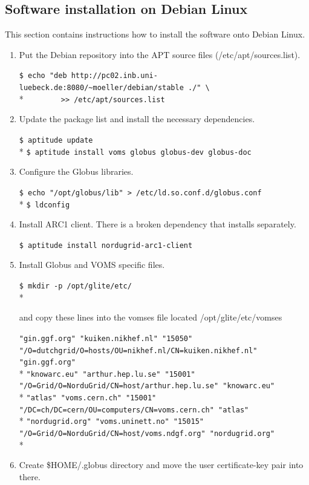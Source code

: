 \documentclass{article}
\begin{document}
\subsection{Software installation on Debian Linux}
This section contains instructions how to install the software onto Debian Linux.
\begin{enumerate}
\item Put the Debian repository into the APT source files (/etc/apt/sources.list).
\begin{shaded}\verb#$ echo "deb http://pc02.inb.uni-luebeck.de:8080/~moeller/debian/stable ./" \#\\*
\verb#        >> /etc/apt/sources.list #\end{shaded}
\item Update the package list and install the necessary dependencies.
\begin{shaded}\verb#$ aptitude update#\\*
\verb#$ aptitude install voms globus globus-dev globus-doc#\end{shaded}
\item Configure the Globus libraries.
\begin{shaded}\verb#$ echo "/opt/globus/lib" > /etc/ld.so.conf.d/globus.conf#\\*
\verb#$ ldconfig#\end{shaded}
\item Install ARC1 client. There is a broken dependency that installs separately.
\begin{shaded}\verb#$ aptitude install nordugrid-arc1-client#\end{shaded}
\item Install Globus and VOMS specific files.
\begin{shaded}\verb#$ mkdir -p /opt/glite/etc/#\\*\end{shaded}
and copy these lines into the vomses file located /opt/glite/etc/vomses
\begin{footnotesize}
\begin{shaded}
\verb#"gin.ggf.org" "kuiken.nikhef.nl" "15050" "/O=dutchgrid/O=hosts/OU=nikhef.nl/CN=kuiken.nikhef.nl" "gin.ggf.org"#\\*
\verb#"knowarc.eu" "arthur.hep.lu.se" "15001" "/O=Grid/O=NorduGrid/CN=host/arthur.hep.lu.se" "knowarc.eu"#\\*
\verb#"atlas" "voms.cern.ch" "15001" "/DC=ch/DC=cern/OU=computers/CN=voms.cern.ch" "atlas"#\\*
\verb#"nordugrid.org" "voms.uninett.no" "15015" "/O=Grid/O=NorduGrid/CN=host/voms.ndgf.org" "nordugrid.org"#\\*
\end{shaded}
\end{footnotesize}
\item Create \$HOME/.globus directory and move the user certificate-key pair into there.
\end{enumerate}
\end{document}
